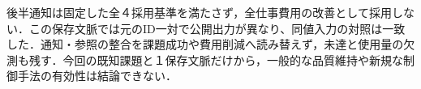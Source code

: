 後半通知は固定した全４採用基準を満たさず，全仕事費用の改善として採用しない．この保存文脈では元のID一対で公開出力が異なり、同値入力の対照は一致した．通知・参照の整合を課題成功や費用削減へ読み替えず，未達と使用量の欠測も残す．今回の既知課題と１保存文脈だけから，一般的な品質維持や新規な制御手法の有効性は結論できない．
